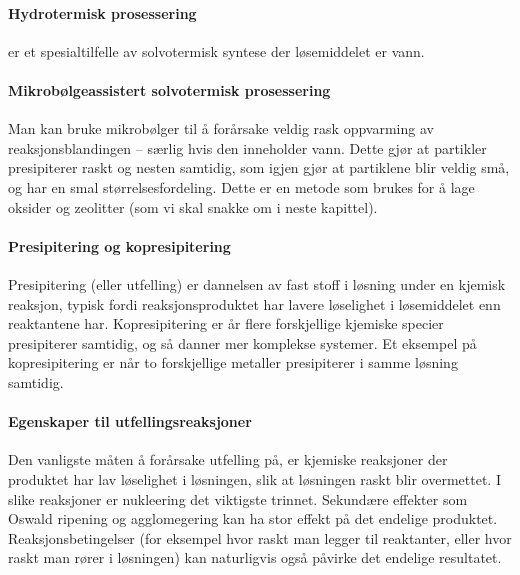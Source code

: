 \paragraph{Hydrotermisk prosessering} er et spesialtilfelle av solvotermisk syntese der løsemiddelet er vann.

\paragraph{Mikrobølgeassistert solvotermisk prosessering} Man kan bruke mikrobølger til å forårsake veldig rask oppvarming av reaksjonsblandingen -- særlig hvis den inneholder vann. Dette gjør at partikler presipiterer raskt og nesten samtidig, som igjen gjør at partiklene blir veldig små, og har en smal størrelsesfordeling. Dette er en metode som brukes for å lage oksider og zeolitter (som vi skal snakke om i neste kapittel).





\paragraph{Presipitering og kopresipitering} Presipitering (eller utfelling) er dannelsen av fast stoff i løsning under en kjemisk reaksjon, typisk fordi reaksjonsproduktet har lavere løselighet i løsemiddelet enn reaktantene har. Kopresipitering er år flere forskjellige kjemiske specier presipiterer samtidig, og så danner mer komplekse systemer. Et eksempel på kopresipitering er når to forskjellige metaller presipiterer i samme løsning samtidig.

\paragraph{Egenskaper til utfellingsreaksjoner} Den vanligste måten å forårsake utfelling på, er kjemiske reaksjoner der produktet har lav løselighet i løsningen, slik at løsningen raskt blir overmettet. I slike reaksjoner er nukleering det viktigste trinnet. Sekundære effekter som Oswald ripening og agglomegering kan ha stor effekt på det endelige produktet. Reaksjonsbetingelser (for eksempel hvor raskt man legger til reaktanter, eller hvor raskt man rører i løsningen) kan naturligvis også påvirke det endelige resultatet.

